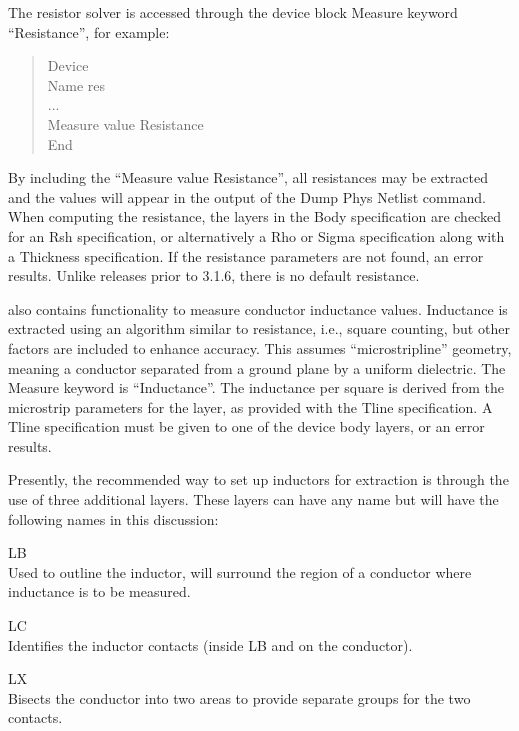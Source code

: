 The resistor solver is accessed through the device block {\et Measure}
keyword ``{\et Resistance}'', for example:

\vspace*{.5cm}

\begin{quote}\rr\vt
Device\\
Name res\\
 ...\\
Measure value Resistance\\
End\\
\end{quote}

By including the ``{\vt Measure value Resistance}'', all resistances
may be extracted and the values will appear in the output of the {\cb
Dump Phys Netlist} command.  When computing the resistance, the layers
in the {\et Body} specification are checked for an {\et Rsh}
specification, or alternatively a {\et Rho} or {\et Sigma}
specification along with a {\et Thickness} specification.  If the
resistance parameters are not found, an error results.  Unlike
releases prior to 3.1.6, there is no default resistance.

{\Xic} also contains functionality to measure conductor inductance
values.  Inductance is extracted using an algorithm similar to
resistance, i.e., square counting, but other factors are included to
enhance accuracy.  This assumes ``microstripline'' geometry, meaning a
conductor separated from a ground plane by a uniform dielectric.  The
{\et Measure} keyword is ``{\vt Inductance}''.  The inductance per
square is derived from the microstrip parameters for the layer, as
provided with the {\et Tline} specification.  A {\et Tline}
specification must be given to one of the device body layers, or an
error results.

Presently, the recommended way to set up inductors for extraction is
through the use of three additional layers.  These layers can have any
name but will have the following names in this discussion:

\begin{description}
\item{\et LB}\\
Used to outline the inductor, will surround the region of a
conductor where inductance is to be measured.

\item{\et LC}\\
Identifies the inductor contacts (inside {\et LB} and on the
conductor).

\item{\et LX}\\
Bisects the conductor into two areas to provide separate groups for
the two contacts.
\end{description}

